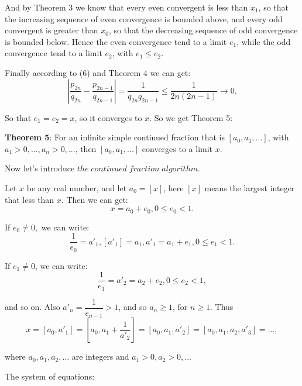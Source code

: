\documentclass[12pt]{article}
\begin{document}
\par And by Theorem 3 we know that every even convergent is less than $x_1$, so that the increasing sequence of even convergence is bounded above, and every odd convergent is greater than $x_0$, so that the decreasing sequence of odd convergence is bounded below. Hence the even convergence tend to a limit $e_1$, while the odd convergence tend to a limit $e_2$, with $e_1\leq e_2$.

Finally according to (6) and Theorem 4 we can get:
\begin{equation*}
|\dfrac{p_{2n}}{q_{2n}}-\dfrac{p_{2n-1}}{q_{2n-1}}|=\dfrac{1}{q_{2n}q_{2n-1}}\leq\dfrac{1}{2n(2n-1)}\rightarrow0.
\end{equation*}
\par So that $e_1=e_2=x$, so it converges to $x$. So we get Theorem 5:\\
\par {\textbf{Theorem 5}}: For an infinite simple continued fraction that is $[a_0,a_1,...]$, with $a_1>0,...,a_n>0,...$, then $[a_0,a_1,...]$ converges to a limit $x$.\\
\par Now let's introduce $the\;continued\;fraction\;algorithm$.\\
\par Let $x$ be any real number, and let $a_0=[x]$, here $[x]$ means the largest integer that less than $x$. Then we can get:
\begin{equation*}
x=a_0+e_0, 0\leq e_0<1.
\end{equation*}
\par If $e_0\neq0,$ we can write:
\begin{equation*}
\dfrac{1}{e_0}=a'_1, [a'_1]=a_1, a'_1=a_1+e_1, 0\leq e_1<1.
\end{equation*}
\par If $e_1\neq 0$, we can write:
\begin{equation*}
\dfrac{1}{e_1}=a'_2=a_2+e_2, 0\leq e_2<1,
\end{equation*}
\par and so on. Also $a'_n=\dfrac{1}{e_{n-1}}>1$, and so $a_n\geq 1$, for $n\geq 1$. Thus
\begin{equation*}
x=[a_0,a'_1]=[a_0,a_1+\dfrac{1}{a'_2}]=[a_0,a_1,a'_2]=[a_0,a_1,a_2,a'_3]=...,
\end{equation*}
\par where $a_0,a_1,a_2,...$ are integers and
$a_1>0,a_2>0,...$\\
\par The system of equations:\\
\end{document}
